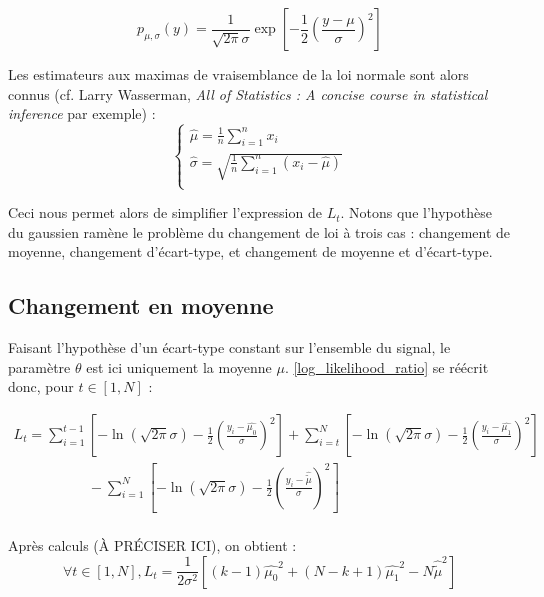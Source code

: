 \documentclass[french,12pt,notitlepage]{report}
\begin{document}
	\begin{equation*}
		p_{\mu, \sigma}(y) = \frac1{\sqrt{2 \pi} \sigma} \exp \left[ -\frac12 \left( \frac{y - \mu}{\sigma} \right)^2 \right]
	\end{equation*}
	
	Les estimateurs aux maximas de vraisemblance de la loi normale sont alors connus (cf. Larry Wasserman, \textit{All of Statistics : A concise course in statistical inference} par exemple) :
	\begin{equation}
	\left\{
	\begin{array}{ll}
		\hat{\mu} = \frac{1}{n} \sum_{i=1}^n x_i \\
		\hat{\sigma} = \sqrt{\frac{1}{n} \sum_{i=1}^n (x_i - \hat{\mu})} \\
	\end{array}
	\right.
	\end{equation}
	
	Ceci nous permet alors de simplifier l'expression de $L_t$. Notons que l'hypothèse du gaussien ramène le problème du changement de loi à trois cas : changement de moyenne, changement d'écart-type, et changement de moyenne et d'écart-type.
	
	\subsection{Changement en moyenne}
	Faisant l'hypothèse d'un écart-type constant sur l'ensemble du signal, le paramètre $\theta$ est ici uniquement la moyenne $\mu$. \ref{log_likelihood_ratio} se réécrit donc, pour $t \in [1,N]$ :
	
	\begin{equation*}
	\begin{array}{ll}
		L_t = \sum_{i=1}^{t-1} \left[-\ln (\sqrt{2 \pi} \sigma)-\frac{1}{2}\left( \frac{y_i-\hat{\mu_0}}{\sigma} \right) ^2 \right] + \sum_{i=t}^{N} \left[-\ln (\sqrt{2 \pi} \sigma)-\frac{1}{2}\left( \frac{y_i-\hat{\mu_1}}{\sigma} \right) ^2 \right] \\
		~~~~~~~~~~~~~~~~~~~~~~~~ - \sum_{i=1}^{N} \left[-\ln (\sqrt{2 \pi} \sigma)-\frac{1}{2}\left( \frac{y_i-\hat{\tilde{\mu}}}{\sigma} \right) ^2 \right] \\
	\end{array}
	\end{equation*}
	
	Après calculs (À PRÉCISER ICI), on obtient :
	\begin{equation}
		\forall t \in [1, N], L_t = \frac{1}{2 \sigma ^2}\left[(k-1)\hat{\mu_0}^2 + (N - k + 1)\hat{\mu_1}^2 - N\hat{\tilde{\mu}}^2 \right]
	\end{equation}
	
\end{document}
